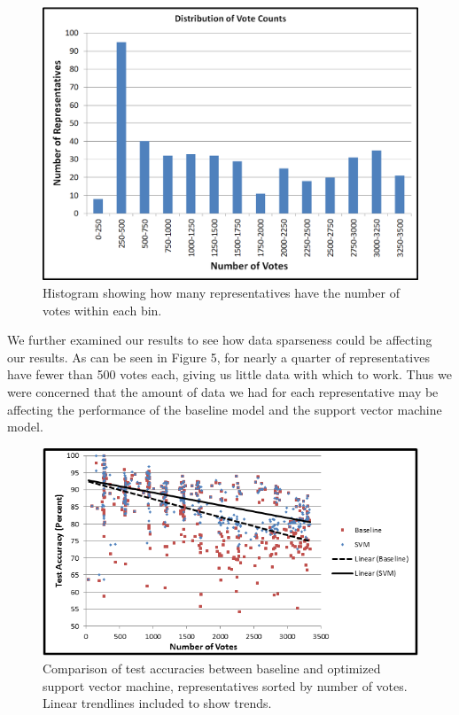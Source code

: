 \documentclass[11pt,letterpaper,twocolumn]{article}
\begin{document}
\begin{figure}
\includegraphics[width=\columnwidth]{data_distribution.png}
\caption{Histogram showing how many representatives have the number of votes within each bin.}
\end{figure}

We further examined our results to see how data sparseness could be affecting our results. As can be seen in Figure 5, for nearly a quarter of representatives have fewer than 500 votes each, giving us little data with which to work. Thus we were concerned that the amount of data we had for each representative may be affecting the performance of the baseline model and the support vector machine model.

\begin{figure}[t]
\includegraphics{size_accuracy2.png}
\caption{Comparison of test accuracies between baseline and optimized support vector machine, representatives sorted by number of votes. Linear trendlines included to show trends.}
\end{figure}
\end{document}
